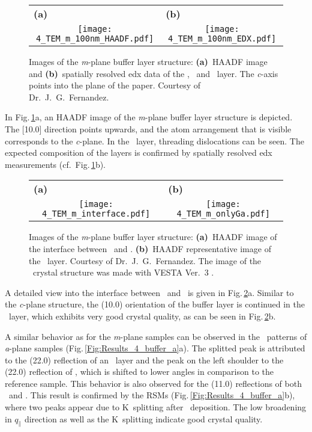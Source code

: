 \begin{figure}[h]
    \centering
    \begin{tabular}{cc}
    \multicolumn{1}{l}{\textbf{(a)}} & \multicolumn{1}{l}{\textbf{(b)}} \\
        \texttt{[image: 4\_TEM\_m\_100nm\_HAADF.pdf]}
        & \texttt{[image: 4\_TEM\_m\_100nm\_EDX.pdf]}
    \end{tabular}
    \caption{
        Images of the \textit{m}-plane buffer layer structure:
        \textbf{(a)}~\acrshort{HAADF} image and \textbf{(b)}~spatially resolved \acrshort{edx} data of the \alo, \cro\ and \agao\ layer.
        The \textit{c}-axis points into the plane of the paper.
        Courtesy of Dr.\ J.\ G.\  Fernandez.
    }
    \label{Fig:Results_4_TEM_m_100nm}
\end{figure}
In Fig.\,\ref{Fig:Results_4_TEM_m_100nm}a, an \acrshort{HAADF} image of the \textit{m}-plane buffer layer structure is depicted.
The [10.0] direction points upwards, and the atom arrangement that is visible corresponds to the \textit{c}-plane.
In the \agao\ layer, threading dislocations can be seen.
The expected composition of the layers is confirmed by spatially resolved \acrshort{edx} measurements (cf.\ Fig.\,\ref{Fig:Results_4_TEM_m_100nm}b).
\begin{figure}
    \centering
    \begin{tabular}{cc}
        \multicolumn{1}{l}{\textbf{(a)}} & \multicolumn{1}{l}{\textbf{(b)}} \\
        \texttt{[image: 4\_TEM\_m\_interface.pdf]}
        & \texttt{[image: 4\_TEM\_m\_onlyGa.pdf]}   
    \end{tabular}
    \caption{
        Images of the \textit{m}-plane buffer layer structure:
        \textbf{(a)}~\acrshort{HAADF} image of the interface between \cro\ and \agao.
        \textbf{(b)}~\acrshort{HAADF} representative image of the \agao\ layer.
        Courtesy of Dr.\ J.\ G.\  Fernandez.
        The image of the \agao\ crystal structure was made with VESTA Ver.~3 \cite{momma2011}.
    }
    \label{Fig:Results_4_TEM_m_zoom}
\end{figure}
A detailed view into the interface between \cro\ and \agao\ is given in Fig.\,\ref{Fig:Results_4_TEM_m_zoom}a.
Similar to the \textit{c}-plane structure, the (10.0) orientation of the buffer layer is continued in the \agao\ layer, which exhibits very good crystal quality, as can be seen in Fig.\,\ref{Fig:Results_4_TEM_m_zoom}b.

A similar behavior as for the \textit{m}-plane samples can be observed in the \thetaomega\ patterns of \textit{a}-plane samples (Fig.\,\ref{Fig:Results_4_buffer_a}a).
The splitted peak is attributed to the (22.0) reflection of an \agao\ layer and the peak on the left shoulder to the (22.0) reflection of \cro, which is shifted to lower angles in comparison to the reference sample.
This behavior is also observed for the (11.0) reflections of both \agao\ and \cro.
This result is confirmed by the \glspl{RSM} (Fig.\,\ref{Fig:Results_4_buffer_a}b), where two peaks appear due to K\textalpha\ splitting after \gao\ deposition.
The low broadening in $q_\parallel$ direction as well as the K\textalpha\ splitting indicate good crystal quality.


